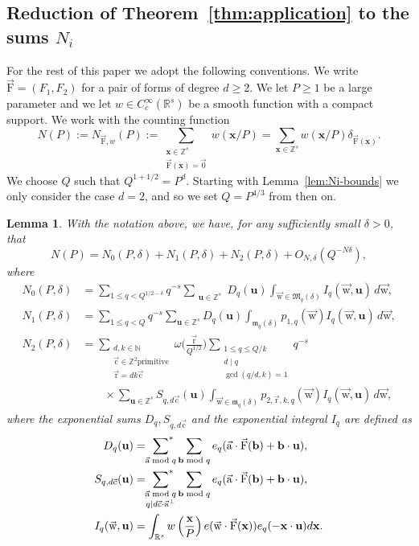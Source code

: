\documentclass[letterpaper,11pt]{amsart}
\numberwithin{equation}{section}
\newtheorem{lemma}[theorem]{Lemma}
\theoremstyle{definition}
\numberwithin{equation}{section}
\newcommand{\Z}{\mathbb{Z}}
\newcommand{\ZZ}{\mathbb{Z}}
\newcommand{\NN}{\mathbb{N}}
\newcommand{\RR}{\mathbb{R}}
\newcommand{\x}{\mathbf{x}}
\newcommand{\uu}{\mathbf{u}}
\newcommand{\bb}{\mathbf{b}}
\newcommand{\starsum}{\sideset{}{^*}\sum}
\newcommand{\ua}{\vec{\mathrm{a}}}
\newcommand{\ur}{\vec{\mathrm{r}}}
\newcommand{\uw}{{\vec{\mathrm{w}}}}
\newcommand{\uF}{{\vec{\mathrm{F}} }}
\newcommand{\uc}{{\vec{\mathrm{c}}}}
\newcommand{\scrm}{\mathfrak{m}}
\newcommand{\R}{\mathbb{R}}
\newcommand{\nF}{\uF}
\begin{document}
\subsection{Reduction of Theorem~\ref{thm:application} to the sums \(N_i\)}\label{sec:the-Ni}
For the rest of this paper we adopt the following conventions. We
write $\nF=(F_1, F_2)$ for a pair of forms of degree $d\geq 2$. We let $P\geq 1$ be a large parameter and we let $w\in C^\infty_c(\RR^s) $ be a smooth function with a compact support. We work with the counting function
\begin{equation*}
N(P):=N_{\nF, w}(P):=\sum_{\substack{\x\in \ZZ^s\\ \nF(\x)=\vec{0}}}w(\x/P)=\sum_{\x\in \ZZ^s}w(\x/P)\delta_{\uF(\x)}.
\end{equation*}
We choose $Q$ such that $Q^{1+1/2}=P^{d}$. Starting with Lemma~\ref{lem:Ni-bounds} we only consider the case $d=2$, and so we set $Q=P^{4/3}$ from then on.

\begin{lemma}\label{lem:N1P}
	With the notation above, we have, for any sufficiently small $\delta>0$, that 
    \begin{equation}\label{eq: N split}
N(P)=N_0(P, \delta)+N_1(P, \delta)+N_2(P, \delta)+O_{N,\delta}(Q^{-N\delta}),
\end{equation}
where
\begin{align} \label{eq:N0def}
N_0(P, \delta)&=\sum_{1\leq q< Q^{1/2-\delta}}q^{-s}
			\sum_{\substack{\uu\in \Z^s}}D_q(\uu)			
			\int_{\uw\in \mathfrak M_q(\delta)} I_q(\uw,\uu)
			\,d\uw,\\\label{eq:N1def}
		N_1(P, \delta)&=\sum_{1\leq q< Q}q^{-s}
			\sum_{\uu\in \Z^s}D_q(\uu)			
			\int_{\scrm_q(\delta)} p_{1,q}(\uw) I_q(\uw,\uu)
			\,d\uw,\\\label{eq:N2def}
			N_2(P, \delta)&=\sum_{\substack{d,k\in\NN\\ \uc\in\ZZ^2 \mathrm{primitive} \\ \ur=dk\uc}}\omega\big(\frac{\ur}{Q^{1/2}}\big)\sum_{\substack{1\leq q\leq Q/k\\ d\mid q\\ \gcd(q/d,k)=1}} q^{-s}				\\ &\quad \quad \times \sum_{\uu\in \Z^s}S_{q,d\uc}(\uu)
			\int_{\uw\in\scrm_q(\delta)}
			p_{2,\ur,k,q}(\uw)I_q(\uw, \uu)
			\,d\uw,			%
            \nonumber
\end{align}
where the exponential sums $D_q, S_{q,d\uc}$ and the exponential integral $I_q$ are defined as
\begin{align}
D_q(\uu)&=\starsum_{\ua \bmod q}\sum_{\bb \bmod q}e_{q}(\ua\cdot \uF(\bb)+\bb\cdot \uu),\label{eq:Dq def}\\
S_{q,d\uc}(\uu)&=\starsum_{\substack{\ua \bmod q\\ q\mid d\uc\cdot\ua^\perp}}\sum_{\bb \bmod q}e_{q}(\ua\cdot \uF(\bb)+\bb\cdot \uu),\label{eq:sq def}\\
I_q(\uw, \uu)&=\int_{\R^s}w\left(\frac{\x}{P}\right)e(\uw\cdot \nF(\x))e_q(-\x\cdot\uu)d\x.\label{eq:Izu def}
\end{align}
\end{lemma}
\end{document}
